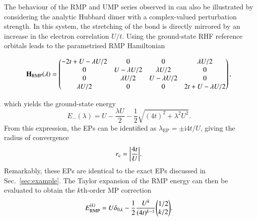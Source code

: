 \documentclass[aps,prb,reprint,noshowkeys,superscriptaddress]{revtex4-1}
\newcommand{\bH}{\mathbf{H}}
\renewcommand{\i}{\mathrm{i}} %
\newcommand{\rc}{r_{\text{c}}}
\newcommand{\lep}{\lambda_{\text{EP}}}
\begin{document}
The behaviour of the RMP and UMP series observed in  can also be illustrated by considering
the analytic Hubbard dimer with a complex-valued perturbation strength.
In this system, the stretching of the  bond is directly mirrored by an increase in the electron correlation $U/t$.
Using the ground-state RHF reference orbitals leads to the parametrised RMP Hamiltonian
\begin{widetext}
\begin{equation}
\label{eq:H_RMP}
\bH_\text{RMP}\qty(\lambda) = 
	\begin{pmatrix}
		-2t + U - \lambda U/2	&	0					&	0					&	\lambda U/2	\\
		0						&	U - \lambda U/2 	&	\lambda U/2			&	0	\\
		0						&	\lambda U/2			&	U - \lambda U/2 	&	0	\\
		\lambda U/2 			&	0 					&	0					&	2t + U - \lambda U/2	\\
	\end{pmatrix},
\end{equation}
\end{widetext}
which yields the ground-state energy 
\begin{equation}
	\label{eq:E0MP}
	E_{-}(\lambda) = U - \frac{\lambda U}{2} - \frac{1}{2} \sqrt{(4t)^2 + \lambda ^2 U^2}.
\end{equation}
From this expression, the EPs can be identified as $\lep = \pm \i 4t / U$,
giving the radius of convergence
\begin{equation}
    \rc = \abs{\frac{4t}{U}}.
\end{equation}
Remarkably, these EPs are identical to the exact EPs discussed in Sec.~\ref{sec:example}.
The Taylor expansion of the RMP energy can then be evaluated to obtain the $k$th-order MP correction
\begin{equation}
	E_\text{RMP}^{(k)} = U \delta_{0,k} - \frac{1}{2} \frac{U^k}{(4t)^{k-1}} \mqty( 1/2 \\ k/2).
\end{equation}
 
\end{document}

